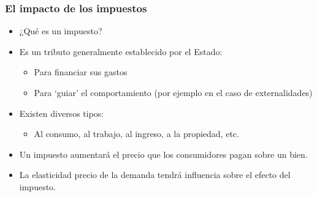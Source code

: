 \documentclass{beamer}
\begin{document}
\begin{frame}
\frametitle{El impacto de los impuestos}
\begin{itemize}
    \item ¿Qué es un impuesto? \vspace{1mm}
    \item Es un tributo generalmente establecido por el Estado: 
    \begin{itemize}
        \item Para financiar sus gastos
        \item Para ‘guiar’ el comportamiento (por ejemplo en el caso de externalidades)
    \end{itemize}
    \vspace{1mm}
    \item Existen diversos tipos:
    \begin{itemize}
        \item Al consumo, al trabajo, al ingreso, a la propiedad, etc.
    \end{itemize}
    \vspace{1mm}
    \item Un impuesto aumentará el precio que los consumidores pagan sobre un bien. \vspace{1mm}
    \item La elasticidad precio de la demanda tendrá influencia sobre el efecto del impuesto.
\end{itemize}
\end{frame}
\end{document}
